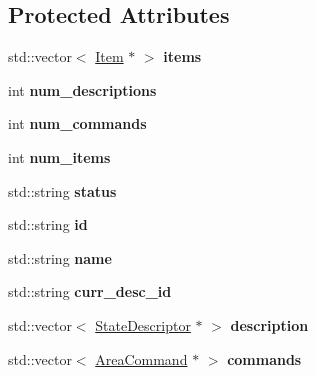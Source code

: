 \subsection*{\-Protected \-Attributes}
\begin{DoxyCompactItemize}
\item 
\hypertarget{class_area_a8fcfd7b9f54f722a6bf8c68ac26ea4f6}{
std\-::vector$<$ \hyperlink{class_item}{\-Item} $\ast$ $>$ {\bfseries items}}
\label{class_area_a8fcfd7b9f54f722a6bf8c68ac26ea4f6}

\item 
\hypertarget{class_area_a4ec123111d0eb0346cc3fa55ee7328e9}{
int {\bfseries num\-\_\-descriptions}}
\label{class_area_a4ec123111d0eb0346cc3fa55ee7328e9}

\item 
\hypertarget{class_area_a698aec5d64c6990033fd3b029c40c117}{
int {\bfseries num\-\_\-commands}}
\label{class_area_a698aec5d64c6990033fd3b029c40c117}

\item 
\hypertarget{class_area_a29d6271cf822fe3c7865e249643b0728}{
int {\bfseries num\-\_\-items}}
\label{class_area_a29d6271cf822fe3c7865e249643b0728}

\item 
\hypertarget{class_area_ab5b23c6cefb5ff678f5544d7b5900b7b}{
std\-::string {\bfseries status}}
\label{class_area_ab5b23c6cefb5ff678f5544d7b5900b7b}

\item 
\hypertarget{class_area_a71dbaaeab0c2f2d0ba296593e59b22ce}{
std\-::string {\bfseries id}}
\label{class_area_a71dbaaeab0c2f2d0ba296593e59b22ce}

\item 
\hypertarget{class_area_a24201719de9d9dfef7a720c036529dd7}{
std\-::string {\bfseries name}}
\label{class_area_a24201719de9d9dfef7a720c036529dd7}

\item 
\hypertarget{class_area_a21fb316841238b230f351620ec97e3a6}{
std\-::string {\bfseries curr\-\_\-desc\-\_\-id}}
\label{class_area_a21fb316841238b230f351620ec97e3a6}

\item 
\hypertarget{class_area_af699bd40b15954f8403309672f01d44b}{
std\-::vector$<$ \hyperlink{class_state_descriptor}{\-State\-Descriptor} $\ast$ $>$ {\bfseries description}}
\label{class_area_af699bd40b15954f8403309672f01d44b}

\item 
\hypertarget{class_area_a5679c7f10791af2545d6853cf0f31ce1}{
std\-::vector$<$ \hyperlink{class_area_command}{\-Area\-Command} $\ast$ $>$ {\bfseries commands}}
\label{class_area_a5679c7f10791af2545d6853cf0f31ce1}

\end{DoxyCompactItemize}


